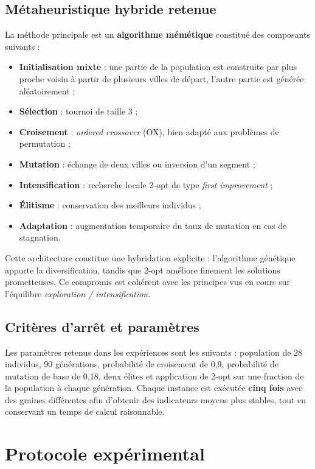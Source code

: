 \documentclass[11pt,a4paper]{article}
\begin{document}
\subsection{Métaheuristique hybride retenue}
La méthode principale est un \textbf{algorithme mémétique} constitué des composants suivants :
\begin{itemize}[leftmargin=1.2cm]
    \item \textbf{Initialisation mixte} : une partie de la population est construite par plus proche voisin à partir de plusieurs villes de départ, l'autre partie est générée aléatoirement ;
    \item \textbf{Sélection} : tournoi de taille 3 ;
    \item \textbf{Croisement} : \emph{ordered crossover} (OX), bien adapté aux problèmes de permutation ;
    \item \textbf{Mutation} : échange de deux villes ou inversion d'un segment ;
    \item \textbf{Intensification} : recherche locale 2-opt de type \emph{first improvement} ;
    \item \textbf{Élitisme} : conservation des meilleurs individus ;
    \item \textbf{Adaptation} : augmentation temporaire du taux de mutation en cas de stagnation.
\end{itemize}

Cette architecture constitue une hybridation explicite : l'algorithme génétique apporte la diversification, tandis que 2-opt améliore finement les solutions prometteuses. Ce compromis est cohérent avec les principes vus en cours sur l'équilibre \emph{exploration / intensification}.

\subsection{Critères d'arrêt et paramètres}
Les paramètres retenus dans les expériences sont les suivants : population de 28 individus, 90 générations, probabilité de croisement de 0,9, probabilité de mutation de base de 0,18, deux élites et application de 2-opt sur une fraction de la population à chaque génération. Chaque instance est exécutée \textbf{cinq fois} avec des graines différentes afin d'obtenir des indicateurs moyens plus stables, tout en conservant un temps de calcul raisonnable.

\section{Protocole expérimental}
\end{document}
